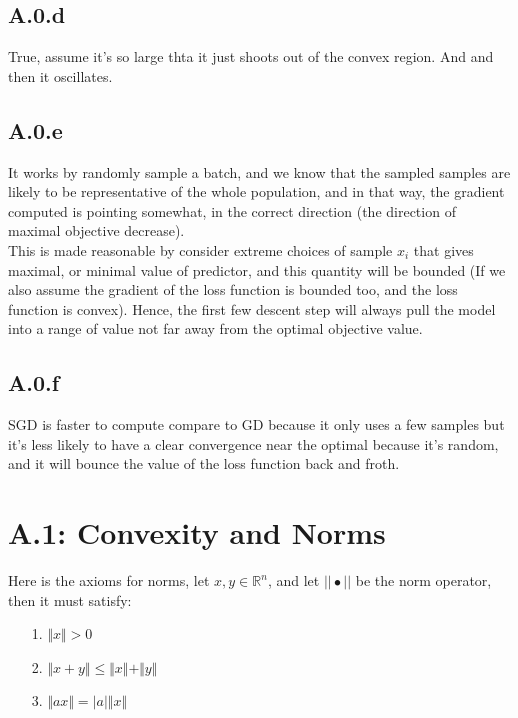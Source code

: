 \documentclass[]{article}
\begin{document}
    \subsection*{A.0.d}
        True, assume it's so large thta it just shoots out of the convex region. And and then it oscillates.  
    \subsection*{A.0.e}
        It works by randomly sample a batch, and we know that the sampled samples are likely to be representative of the whole population, and in that way, the gradient computed is pointing somewhat, in the correct direction (the direction of maximal objective decrease).
        \\
        This is made reasonable by consider extreme choices of sample $x_i$ that gives maximal, or minimal value of predictor, and this quantity will be bounded (If we also assume the gradient of the loss function is bounded too, and the loss function is convex). Hence, the first few descent step will always pull the model into a range of value not far away from the optimal objective value.  
    \subsection*{A.0.f}
        SGD is faster to compute compare to GD because it only uses a few samples but it's less likely to have a clear convergence near the optimal because it's random, and it will bounce the value of the loss function back and froth. 

\section*{A.1: Convexity and Norms}
    Here is the axioms for norms, let $x, y\in \mathbb{R}^n$, and let $||\bullet||$ be the norm operator, then it must satisfy: 
    \begin{enumerate}
    \item[1.] $\Vert x\Vert > 0$
    \item[2.] $\Vert x + y\Vert \le \Vert x\Vert + \Vert y\Vert$ 
    \item[3.] $\Vert a x\Vert = |a|\Vert x\Vert$ 
    \end{enumerate}
\end{document}
